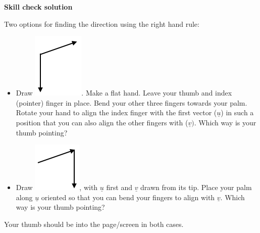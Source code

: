 \documentclass[12pt,letterpaper,noanswers]{exam}
\newcommand{\mb}[1]{\underline{#1}}
\begin{document}
\noindent\textbf{Skill check solution}
\begin{questions}
\item Two options for finding the direction using the right hand rule: 
\begin{itemize}
    \item Draw \includegraphics[scale=0.5]{img/C06p1c.png}.  Make a flat hand.  Leave your thumb and index (pointer) finger in place.  Bend your other three fingers towards your palm.  Rotate your hand to align the index finger with the first vector ($\mb{u}$) in such a position that you can also align the other fingers with ($\mb{v})$.  Which way is your thumb pointing?
    \item Draw \includegraphics[scale=0.5]{img/C06p1d.png}, with $\mb{u}$ first and $\mb{v}$ drawn from its tip.  Place your palm along $\mb{u}$ oriented so that you can bend your fingers to align with $\mb{v}$.  Which way is your thumb pointing?
\end{itemize}
Your thumb should be into the page/screen in both cases.



\end{questions}
\end{document}
